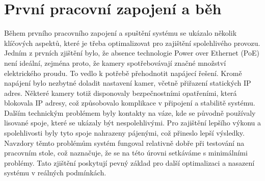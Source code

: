 \section{První pracovní zapojení a běh}\label{sec:prvni-pracovni-zapojeni-a-beh}
Během prvního pracovního zapojení a spuštění systému se ukázalo několik klíčových aspektů, které je třeba optimalizovat pro zajištění spolehlivého provozu.
Jedním z prvních zjištění bylo, že absence technologie Power over Ethernet (PoE) není ideální, zejména proto, že kamery spotřebovávají značné množství elektrického proudu.
To vedlo k potřebě přehodnotit napájecí řešení.
\newline
Kromě napájení bylo nezbytné doladit nastavení kamer, včetně přiřazení statických IP adres.
Některé kamery totiž disponovaly bezpečnostními opatřeními, která blokovala IP adresy, což způsobovalo komplikace v připojení a stabilitě systému.
\newline
Dalším technickým problémem byly kontakty na váze, kde se původně používaly lisované spoje, které se ukázaly být nespolehlivými.
Pro zajištění lepšího výkonu a spolehlivosti byly tyto spoje nahrazeny pájenými, což přineslo lepší výsledky.
\newline
Navzdory těmto problémům systém fungoval relativně dobře při testování na pracovním stole, což naznačuje, že se na této úrovni setkáváme s minimálními problémy.
Tato zjištění poskytují pevný základ pro další optimalizaci a nasazení systému v reálných podmínkách.


\newpage


